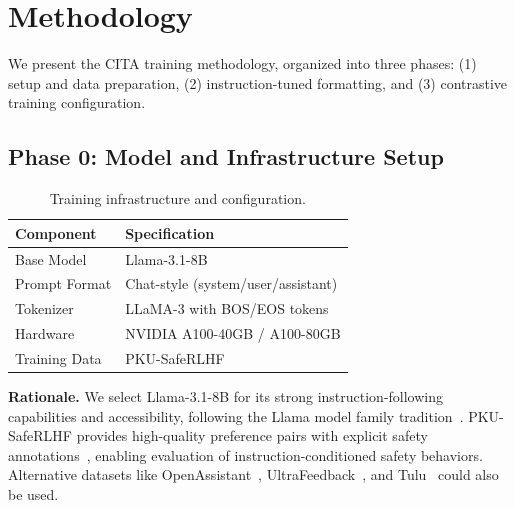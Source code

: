
\vspace{-2mm}
\section{Methodology}
\label{sec:methodology}

We present the CITA training methodology, organized into three phases: (1) setup and data preparation, (2) instruction-tuned formatting, and (3) contrastive training configuration.

\vspace{-2mm}
\subsection{Phase 0: Model and Infrastructure Setup}
\label{sec:phase0}

\begin{table}[H]
\centering
\small
\begin{tabular}{@{}ll@{}}
\toprule
\textbf{Component} & \textbf{Specification} \\
\midrule
Base Model & Llama-3.1-8B~\cite{dubey2024llama} \\
\hline
Prompt Format & Chat-style (system/user/assistant) \\
\hline
Tokenizer & LLaMA-3 with BOS/EOS tokens \\
\hline
Hardware & NVIDIA A100-40GB / A100-80GB \\
\hline
Training Data & PKU-SafeRLHF~\cite{ji2024pku} \\
\bottomrule
\end{tabular}
\caption{Training infrastructure and configuration.}
\label{tab:infrastructure}
\vspace{-4mm}
\end{table}

\textbf{Rationale.} We select Llama-3.1-8B for its strong instruction-following capabilities and accessibility, following the Llama model family tradition~\cite{touvron2023llama,touvron2023llama1,dubey2024llama3}. PKU-SafeRLHF provides high-quality preference pairs with explicit safety annotations~\cite{bai2022training}, enabling evaluation of instruction-conditioned safety behaviors. Alternative datasets like OpenAssistant~\cite{kopf2023openassistant}, UltraFeedback~\cite{cui2023ultrafeedback}, and Tulu~\cite{ivison2023camels} could also be used.

